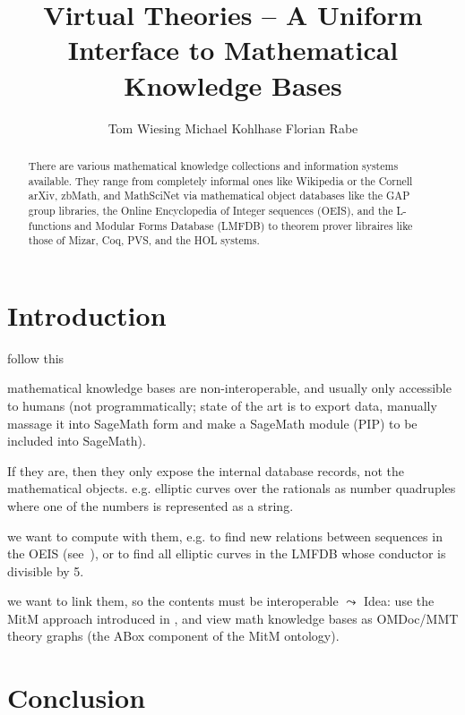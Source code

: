 \documentclass{llncs}
\title{Virtual Theories -- A Uniform Interface to Mathematical Knowledge Bases}
\author{
Tom Wiesing\inst{1}
Michael Kohlhase\inst{1} 
Florian Rabe\inst{2} 
}
\institute{
   FAU Erlangen-N\"urnberg
   \and Jacobs University Bremen
}
\begin{document}
\maketitle
\begin{abstract}
  There are various mathematical knowledge collections and information systems
  available. They range from completely informal ones like Wikipedia or the Cornell arXiv,
  zbMath, and MathSciNet via mathematical object databases like the GAP group libraries,
  the Online Encyclopedia of Integer sequences (OEIS), and the L-functions and Modular
  Forms Database (LMFDB) to theorem prover libraires like those of Mizar, Coq, PVS, and
  the HOL systems.
\end{abstract}

\section{Introduction}\label{sec:intro}
\begin{todolist}{follow this}
\item mathematical knowledge bases are non-interoperable, and usually only accessible to
  humans (not programmatically; state of the art is to export data, manually massage it
  into SageMath form and make a SageMath module (PIP) to be included into SageMath). 
\item If they are, then they only expose the internal database records, not the
  mathematical objects. e.g. elliptic curves over the rationals as number quadruples where
  one of the numbers is represented as a string.
\item we want to compute with them, e.g. to find new relations between sequences in the
  OEIS (see~\cite{LuzKoh:fsarfo16}), or to find all elliptic curves in the LMFDB whose
  conductor is divisible by 5. 
\item we want to link them, so the contents must be interoperable $\leadsto$ Idea: use
  the MitM approach introduced in \cite{DehKohKon:iop16}, and view math knowledge bases as
  OMDoc/MMT theory graphs (the ABox component of the MitM ontology).
\item 
\end{todolist}
\section{Conclusion}\label{sec:concl}
\printbibliography
\end{document}
